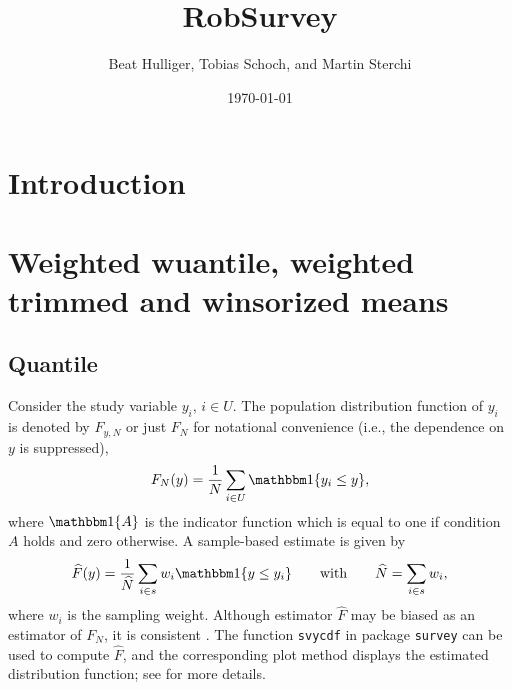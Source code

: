 \documentclass[a4paper,11pt]{scrreprt}
\theoremstyle{remark}
\begin{document}

\title{\Large RobSurvey}
\author{Beat Hulliger, Tobias Schoch, and Martin Sterchi}
\date{{\small \today}}
\maketitle
\tableofcontents

\chapter{Introduction}\label{ch:introduction}


\chapter{Weighted wuantile, weighted trimmed and winsorized means}\label{ch:basic}


\section{Quantile}
Consider the study variable $y_i$, $i \in U$. The population distribution function of $y_i$ is denoted by $F_{y,N}$ or just $F_N$ for notational convenience (i.e., the dependence on $y$ is suppressed), 
\begin{equation*}
   F_N(y) = \frac{1}{N}\sum_{i \in U} \indicator\{y_i \leq y \}, 
\end{equation*}
\noindent where $\indicator\{ A \}$ is the indicator function which is equal to one if condition $A$ holds and zero otherwise. A sample-based estimate is given by 
\begin{equation*}
   \widehat{F}(y) = \frac{1}{\widehat{N}}\sum_{i \in s} w_i \indicator\{y \leq y_i \} \qquad \text{with} \qquad \widehat{N} = \sum_{i \in s} w_i,  
\end{equation*}
\noindent where $w_i$ is the sampling weight. Although estimator $\widehat{F}$ may be biased as an estimator of $F_N$, it is consistent \citep[][]{sarndaletal1992}. The function \texttt{svycdf} in package \texttt{survey} can be used to compute $\widehat{F}$, and the corresponding plot method displays the estimated distribution function; see \citet[][ch. 4.3.1]{lumley2010} for more details. 
  
\end{document}
